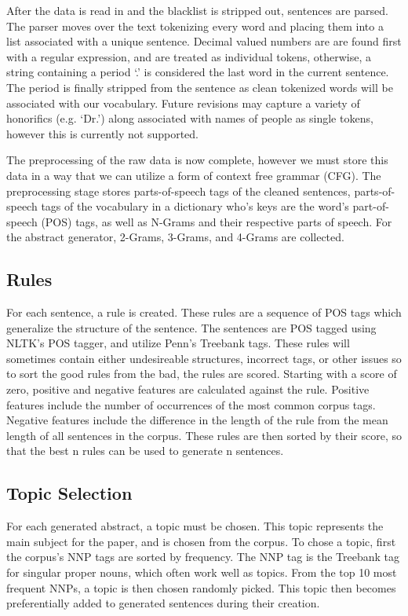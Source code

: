\documentclass[letterpaper, 10 pt, conference]{ieeeconf}  %
\begin{document}
After the data is read in and the blacklist is stripped out, sentences are parsed. The parser moves over the text tokenizing every word and placing them into a list associated with a unique sentence. Decimal valued numbers are are found first with a regular expression, and are treated as individual tokens, otherwise, a string containing a period ‘.’ is considered the last word in the current sentence. The period is finally stripped from the sentence as clean tokenized words will be associated with our vocabulary. Future revisions may capture a variety of honorifics (e.g. ‘Dr.’) along associated with names of people as single tokens, however this is currently not supported.

The preprocessing of the raw data is now complete, however we must store this data in a way that we can utilize a form of context free grammar (CFG). The preprocessing stage stores parts-of-speech tags of the cleaned sentences, parts-of-speech tags of the vocabulary in a dictionary who's keys are the word's part-of-speech (POS) tags, as well as N-Grams and their respective parts of speech. For the abstract generator, 2-Grams, 3-Grams, and 4-Grams are collected.

\subsection{Rules}

For each sentence, a rule is created. These rules are a sequence of POS tags which generalize the structure of the sentence. The sentences are POS tagged using NLTK's POS tagger, and utilize Penn's Treebank tags. These rules will sometimes contain either undesireable structures, incorrect tags, or other issues so to sort the good rules from the bad, the rules are scored. Starting with a score of zero, positive and negative features are calculated against the rule. Positive features include the number of occurrences of the most common corpus tags. Negative features include the difference in the length of the rule from the mean length of all sentences in the corpus. These rules are then sorted by their score, so that the best n rules can be used to generate n sentences.

\subsection{Topic Selection}

For each generated abstract, a topic must be chosen. This topic represents the main subject for the paper, and is chosen from the corpus. To chose a topic, first the corpus's NNP tags are sorted by frequency. The NNP tag is the Treebank tag for singular proper nouns, which often work well as topics. From the top 10 most frequent NNPs, a topic is then chosen randomly picked. This topic then becomes preferentially added to generated sentences during their creation.
\end{document}
